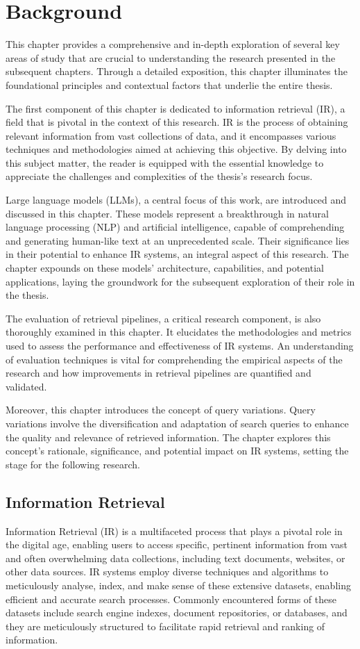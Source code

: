 \chapter{Background}
This chapter provides a comprehensive and in-depth exploration of several key areas of study that are crucial to understanding the research presented in the subsequent chapters. Through a detailed exposition, this chapter illuminates the foundational principles and contextual factors that underlie the entire thesis.

The first component of this chapter is dedicated to information retrieval (IR), a field that is pivotal in the context of this research. IR is the process of obtaining relevant information from vast collections of data, and it encompasses various techniques and methodologies aimed at achieving this objective. By delving into this subject matter, the reader is equipped with the essential knowledge to appreciate the challenges and complexities of the thesis's research focus.

Large language models (LLMs), a central focus of this work, are introduced and discussed in this chapter. These models represent a breakthrough in natural language processing (NLP) and artificial intelligence, capable of comprehending and generating human-like text at an unprecedented scale. Their significance lies in their potential to enhance IR systems, an integral aspect of this research. The chapter expounds on these models' architecture, capabilities, and potential applications, laying the groundwork for the subsequent exploration of their role in the thesis.

The evaluation of retrieval pipelines, a critical research component, is also thoroughly examined in this chapter. It elucidates the methodologies and metrics used to assess the performance and effectiveness of IR systems. An understanding of evaluation techniques is vital for comprehending the empirical aspects of the research and how improvements in retrieval pipelines are quantified and validated.

Moreover, this chapter introduces the concept of query variations. Query variations involve the diversification and adaptation of search queries to enhance the quality and relevance of retrieved information. The chapter explores this concept's rationale, significance, and potential impact on IR systems, setting the stage for the following research.

\section{Information Retrieval}
Information Retrieval (IR) is a multifaceted process that plays a pivotal role in the digital age, enabling users to access specific, pertinent information from vast and often overwhelming data collections, including text documents, websites, or other data sources. IR systems employ diverse techniques and algorithms to meticulously analyse, index, and make sense of these extensive datasets, enabling efficient and accurate search processes. Commonly encountered forms of these datasets include search engine indexes, document repositories, or databases, and they are meticulously structured to facilitate rapid retrieval and ranking of information.

